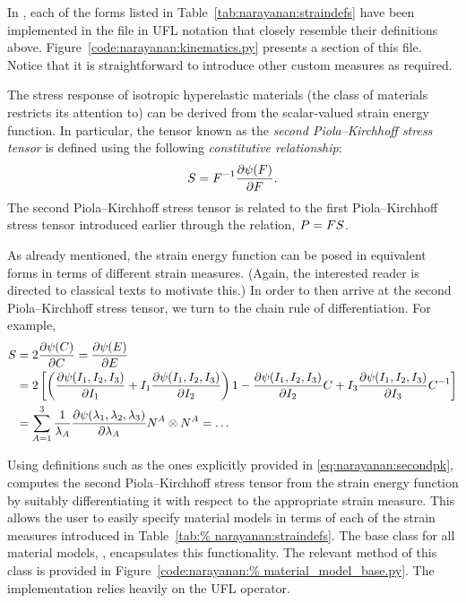 In \twist, each of the forms listed in
Table~\ref{tab:narayanan:straindefs} have been implemented in the file
 in UFL notation that closely resemble their
definitions above. Figure~\ref{code:narayanan:kinematics.py} presents
a section of this file. Notice that it is straightforward to introduce
other custom measures as required.

The stress response of isotropic hyperelastic materials (the class of
materials \twist{} restricts its attention to) can be derived from the
scalar-valued strain energy function. In particular, the tensor known
as the {\em second Piola--Kirchhoff stress tensor} is defined using the
following {\em constitutive relationship}:
\begin{equation}
  \mbox{$ S$} = \mbox{$ F$}^{-1} \frac{\partial \psi(\mbox{$ F$})}{\partial \mbox{$ F$}}.
\end{equation}
The second Piola--Kirchhoff stress tensor is related to the first
Piola--Kirchhoff stress tensor introduced earlier through the relation,
$\mbox{$ P$} = \mbox{$ F$} \mbox{$ S$}$.

As already mentioned, the strain energy function can be posed in
equivalent forms in terms of different strain measures. (Again, the
interested reader is directed to classical texts to motivate this.) In
order to then arrive at the second Piola--Kirchhoff stress tensor, we
turn to the chain rule of differentiation. For example,
\begin{equation}
  \begin{split}
    \mbox{$ S$} & = 2 \frac{\partial \psi(\mbox{$ C$})}{\partial \mbox{$ C$}} =
    \frac{\partial \psi(\mbox{$ E$})}{\partial \mbox{$ E$}}\\
    & = 2\left[\left(\frac{\partial \psi (I_{1}, I_{2},
          I_{3})}{\partial I_{1}} + I_{1} \frac{\partial \psi (I_{1},
          I_{2}, I_{3})}{\partial I_{2}} \right) {1} -
      \frac{\partial \psi (I_{1}, I_{2}, I_{3})}{\partial I_{2}} \mbox{$ C$} +
      I_{3} \frac{\partial \psi (I_{1}, I_{2}, I_{3})}{\partial I_{3}}
      \mbox{$ C$}^{-1} \right]\\
    & = \sum_{A = 1}^{3} \frac{1}{\lambda_{A}} \frac{\partial
      \psi(\lambda_{1}, \lambda_{2}, \lambda_{3})}{\partial
      \lambda_{A}} \mbox{$ N$}^{A}\otimes\mbox{$ N$}^{A} = \ldots
  \end{split}
  \label{eq:narayanan:secondpk}
\end{equation}

Using definitions such as the ones explicitly provided in
\eqref{eq:narayanan:secondpk}, \twist{} computes the second
Piola--Kirchhoff stress tensor from the strain energy function by
suitably differentiating it with respect to the appropriate strain
measure. This allows the user to easily specify material models in
terms of each of the strain measures introduced in Table~\ref{tab:%
narayanan:straindefs}. The base class for all material models,
, encapsulates this functionality. The relevant
method of this class is provided in Figure~\ref{code:narayanan:%
material_model_base.py}. The implementation relies heavily on the UFL
 operator.

